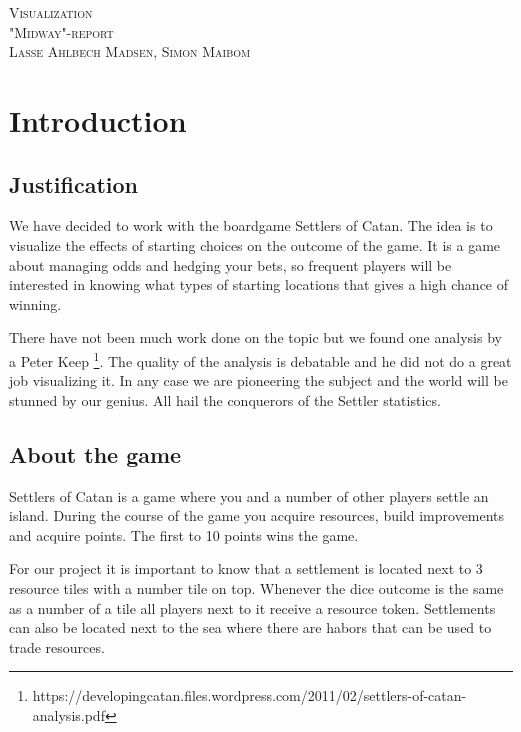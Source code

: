 \documentclass{article}
\begin{document}
\begin{center}
\textsc{\Large Visualization}\\[0.5cm]
\textsc{\large "Midway"-report}\\[0.5cm]
\textsc{\large Lasse Ahlbech Madsen, Simon Maibom}\\[0.5cm]
\vspace{1 cm}
\end{center}

\section{Introduction}

\subsection{Justification}

We have decided to work with the boardgame Settlers of Catan. The idea is to
visualize the effects of starting choices on the outcome of the game. It is a
game about managing odds and hedging your bets, so frequent players will be
interested in knowing what types of starting locations that gives a high
chance of winning. 

There have not been much work done on the topic but we found one analysis by a 
Peter Keep
\footnote{https://developingcatan.files.wordpress.com/2011/02/settlers-of-catan-analysis.pdf}.
The quality of the analysis is debatable and he did not do a great job
visualizing it. In any case we are pioneering the subject and the world will
be stunned by our genius. All hail the conquerors of the Settler statistics.

\subsection{About the game}

Settlers of Catan is a game where you and a number of other players settle
an island. During the course of the game you acquire resources, build
improvements and acquire points. The first to 10 points wins the game. 

For our project it is important to know that a settlement is located next
to 3 resource tiles with a number tile on top. Whenever the dice outcome is
the same as a number of a tile all players next to it receive a resource
token. Settlements can also be located next to the sea where there are habors
that can be used to trade resources.
\end{document}

